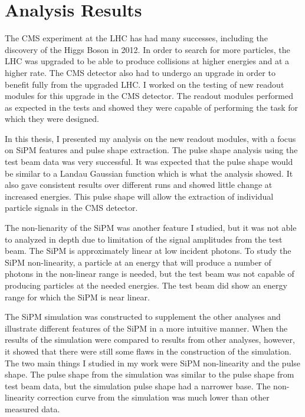 \section{Analysis Results}

The CMS experiment at the LHC has had many successes, including the discovery of the Higgs Boson in 2012. In order to search for more particles, the LHC was upgraded to be able to produce collisions at higher energies and at a higher rate. The CMS detector also had to undergo an upgrade in order to benefit fully from the upgraded LHC. I worked on the testing of new readout modules for this upgrade in the CMS detector. The readout modules performed as expected in the tests and showed they were capable of performing the task for which they were designed. 

In this thesis, I presented my analysis on the new readout modules, with a focus on SiPM features and pulse shape extraction. The pulse shape analysis using the test beam data was very successful. It was expected that the pulse shape would be similar to a Landau Gaussian function which is what the analysis showed. It also gave consistent results over different runs and showed little change at increased energies. This pulse shape will allow the extraction of individual particle signals in the CMS detector. 

The non-lienarity of the SiPM was another feature I studied, but it was not able to analyzed in depth due to limitation of the signal amplitudes from the test beam. The SiPM is approximately linear at low incident photons. To study the SiPM non-linearity, a particle at an energy that will produce a number of photons in the non-linear range is needed, but the test beam was not capable of producing particles at the needed energies. The test beam did show an energy range for which the SiPM is near linear.

The SiPM simulation was constructed to supplement the other analyses and illustrate different features of the SiPM in a more intuitive manner. When the results of the simulation were compared to results from other analyses, however, it showed that there were still some flaws in the construction of the simulation. The two main things I studied in my work were SiPM non-linearity and the pulse shape. The pulse shape from the simulation was similar to the pulse shape from test beam data, but the simulation pulse shape had a narrower base. The non-linearity correction curve from the simulation was much lower than other measured data.

